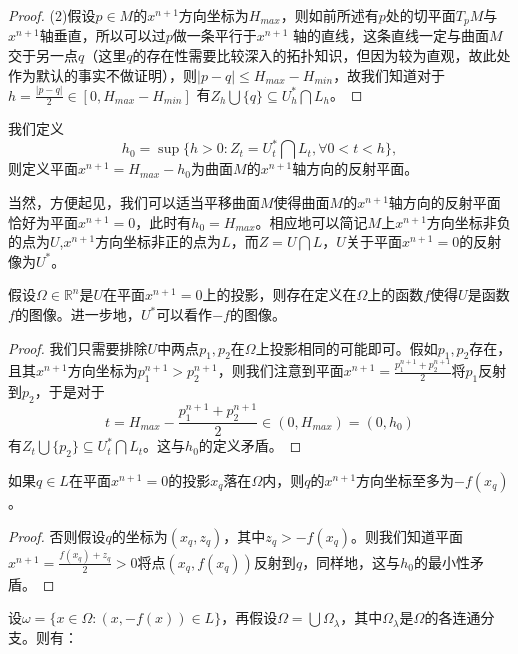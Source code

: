 \begin{enumerate}
\begin{proof}
(2)假设$p\in M$的$x^{n+1}$方向坐标为$H_{max}$，则如前所述有$p$处的切平面$T_{p}M$与$x^{n+1}$轴垂直，所以可以过$p$做一条平行于$x^{n+1}$ 轴的直线，这条直线一定与曲面$M$交于另一点$q$（这里$q$的存在性需要比较深入的拓扑知识，但因为较为直观，故此处作为默认的事实不做证明），则$|p-q|\leq H_{max}-H_{min}$，故我们知道对于$h=\frac{|p-q|}{2}\in[0,H_{max}-H_{min}]$ 有$Z_{h}\bigcup\{q\}\subseteq U^{\ast}_{h}\bigcap L_{h}$。
\end{proof}
\begin{definition}
我们定义
\begin{displaymath}
h_{0}=\sup\{h>0:Z_{t}=U^{\ast}_{t}\bigcap L_{t},\forall 0<t<h\},
\end{displaymath}
则定义平面$x^{n+1}=H_{max}-h_{0}$为曲面$M$的$x^{n+1}$轴方向的反射平面。
\end{definition}
当然，方便起见，我们可以适当平移曲面$M$使得曲面$M$的$x^{n+1}$轴方向的反射平面恰好为平面$x^{n+1}=0$，此时有$h_{0}=H_{max}$。相应地可以简记$M$上$x^{n+1}$方向坐标非负的点为$U$,$x^{n+1}$方向坐标非正的点为$L$，而$Z=U\bigcap L$，$U$关于平面$x^{n+1}=0$的反射像为$U^{\ast}$。
\begin{lemma}
假设$\Omega\in\mathbb{R}^{n}$是$U$在平面$x^{n+1}=0$上的投影，则存在定义在$\Omega$上的函数$f$使得$U$是函数$f$的图像。进一步地，$U^{\ast}$可以看作$-f$的图像。
\end{lemma}
\begin{proof}
我们只需要排除$U$中两点$p_{1},p_{2}$在$\Omega$上投影相同的可能即可。假如$p_{1},p_{2}$存在，且其$x^{n+1}$方向坐标为$p^{n+1}_{1}>p^{n+1}_{2}$，则我们注意到平面$x^{n+1}=\frac{p^{n+1}_{1}+p^{n+1}_{2}}{2}$将$p_{1}$反射到$p_{2}$，于是对于
\begin{displaymath}
t=H_{max}-\frac{p^{n+1}_{1}+p^{n+1}_{2}}{2}\in(0,H_{max})=(0,h_{0})
\end{displaymath}
有$Z_{t}\bigcup\{p_{2}\}\subseteq U^{\ast}_{t}\bigcap L_{t}$。这与$h_{0}$的定义矛盾。
\end{proof}
\begin{theorem}
如果$q\in L$在平面$x^{n+1}=0$的投影$x_{q}$落在$\Omega$内，则$q$的$x^{n+1}$方向坐标至多为$-f(x_{q})$。
\end{theorem}
\begin{proof}
否则假设$q$的坐标为$(x_{q},z_{q})$，其中$z_{q}>-f(x_{q})$。则我们知道平面$x^{n+1}=\frac{f(x_{q})+z_{q}}{2}>0$将点$(x_{q},f(x_{q}))$反射到$q$，同样地，这与$h_{0}$的最小性矛盾。
\end{proof}
\begin{theorem}
设$\omega=\{x\in\Omega: (x,-f(x))\in L\}$，再假设$\Omega=\bigcup\Omega_{\lambda}$，其中$\Omega_{\lambda}$是$\Omega$的各连通分支。则有：\\

\end{theorem}
\end{enumerate}

